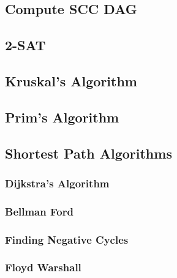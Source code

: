 \documentclass[11pt, letterpaper]{article}
\begin{document}
\subsection{Compute SCC DAG}


\subsection{2-SAT}


\subsection{Kruskal's Algorithm}


\subsection{Prim's Algorithm}


\subsection{Shortest Path Algorithms}
\subsubsection{Dijkstra's Algorithm}


\subsubsection{Bellman Ford}


\subsubsection{Finding Negative Cycles}


\subsubsection{Floyd Warshall}

\end{document}
